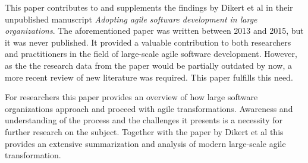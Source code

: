 This paper contributes to and supplements the findings by Dikert et
al in their unpublished manuscript \textit{Adopting agile software
development in large organizations}. The aforementioned paper was
written between 2013 and 2015, but it was never published. It provided a
valuable contribution to both researchers and practitioners in the field
of large-scale agile software development. However, as the the research
data from the paper would be partially outdated by now, a more recent
review of new literature was required. This paper fulfills this need.

For researchers this paper provides an overview of how large software
organizations approach and proceed with agile transformations. Awareness
and understanding of the process and the challenges it presents is a
necessity for further research on the subject. Together with the paper
by Dikert et al this provides an extensive summarization and analysis of
modern large-scale agile transformation.
